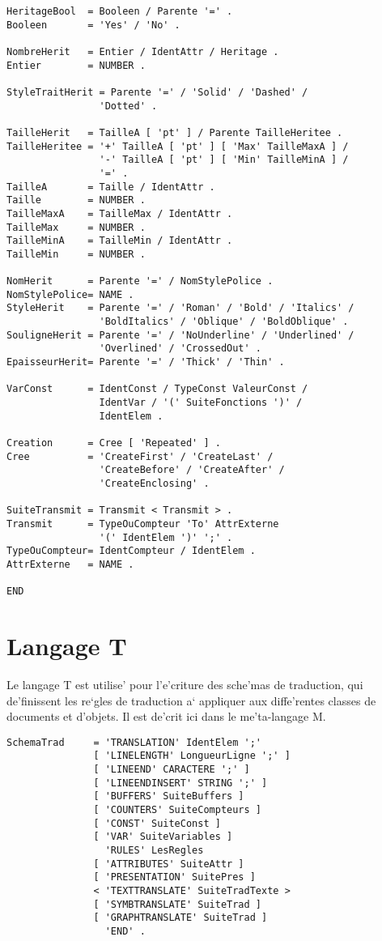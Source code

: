 {\begin{verbatim}
HeritageBool  = Booleen / Parente '=' .
Booleen       = 'Yes' / 'No' .

NombreHerit   = Entier / IdentAttr / Heritage .
Entier        = NUMBER .

StyleTraitHerit = Parente '=' / 'Solid' / 'Dashed' /
                'Dotted' .

TailleHerit   = TailleA [ 'pt' ] / Parente TailleHeritee .
TailleHeritee = '+' TailleA [ 'pt' ] [ 'Max' TailleMaxA ] /
                '-' TailleA [ 'pt' ] [ 'Min' TailleMinA ] /
                '=' .
TailleA       = Taille / IdentAttr .
Taille        = NUMBER .
TailleMaxA    = TailleMax / IdentAttr .
TailleMax     = NUMBER .
TailleMinA    = TailleMin / IdentAttr .
TailleMin     = NUMBER .

NomHerit      = Parente '=' / NomStylePolice .
NomStylePolice= NAME .
StyleHerit    = Parente '=' / 'Roman' / 'Bold' / 'Italics' / 
                'BoldItalics' / 'Oblique' / 'BoldOblique' .
SouligneHerit = Parente '=' / 'NoUnderline' / 'Underlined' / 
                'Overlined' / 'CrossedOut' .
EpaisseurHerit= Parente '=' / 'Thick' / 'Thin' .

VarConst      = IdentConst / TypeConst ValeurConst /
                IdentVar / '(' SuiteFonctions ')' /
                IdentElem .

Creation      = Cree [ 'Repeated' ] .
Cree          = 'CreateFirst' / 'CreateLast' /
                'CreateBefore' / 'CreateAfter' /
                'CreateEnclosing' .

SuiteTransmit = Transmit < Transmit > .
Transmit      = TypeOuCompteur 'To' AttrExterne
                '(' IdentElem ')' ';' .
TypeOuCompteur= IdentCompteur / IdentElem .
AttrExterne   = NAME .

END
\end{verbatim}

\section{Langage T}

Le langage T est utilise' pour l'e'criture des sche'mas de traduction, qui
de'finissent les re`gles de traduction a` appliquer aux diffe'rentes classes
de documents et d'objets. Il est de'crit ici dans le me'ta-langage M.

\begin{verbatim}
SchemaTrad     = 'TRANSLATION' IdentElem ';'
               [ 'LINELENGTH' LongueurLigne ';' ]
               [ 'LINEEND' CARACTERE ';' ]
               [ 'LINEENDINSERT' STRING ';' ]
               [ 'BUFFERS' SuiteBuffers ]
               [ 'COUNTERS' SuiteCompteurs ]
               [ 'CONST' SuiteConst ]
               [ 'VAR' SuiteVariables ]
                 'RULES' LesRegles
               [ 'ATTRIBUTES' SuiteAttr ]
               [ 'PRESENTATION' SuitePres ]
               < 'TEXTTRANSLATE' SuiteTradTexte >
               [ 'SYMBTRANSLATE' SuiteTrad ]
               [ 'GRAPHTRANSLATE' SuiteTrad ]
                 'END' .


\end{verbatim}}
